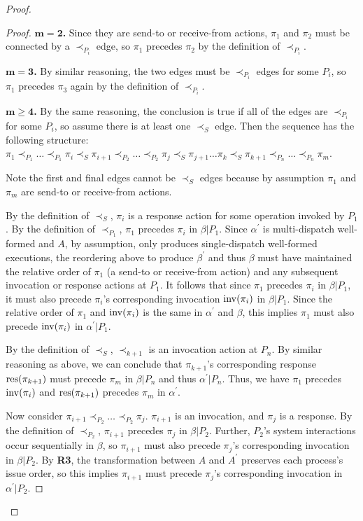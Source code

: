 \begin{proof}
\begin{proof}
      $\mathbf{m=2}$\textbf{.} Since they are send-to or receive-from actions, $\pi_1$ and $\pi_2$ must be connected by a $\prec_{P_i}$ edge, so $\pi_1$ precedes $\pi_2$ by the definition of $\prec_{P_i}$.

      $\mathbf{m=3}$\textbf{.} By similar reasoning, the two edges must be $\prec_{P_i}$ edges for some $P_i$, so $\pi_1$ precedes $\pi_3$ again by the definition of $\prec_{P_i}$.

      $\mathbf{m \geq 4}$\textbf{.} By the same reasoning, the conclusion is true if all of the edges are $\prec_{P_i}$ for some $P_i$, so assume there is at least one $\prec_S$ edge.
      Then the sequence has the following structure:
      $\pi_1 \prec_{P_1} \ldots \prec_{P_1} \pi_i \prec_S \pi_{i+1} \prec_{P_2} \ldots \prec_{P_2} \pi_j \prec_S \pi_{j+1} \ldots \pi_k \prec_S \pi_{k+1} \prec_{P_n} \ldots \prec_{P_n} \pi_m$.

      Note the first and final edges cannot be $\prec_S$ edges because by assumption $\pi_1$ and $\pi_m$ are send-to or receive-from actions.

      By the definition of $\prec_S$, $\pi_i$ is a response action for some operation invoked by $P_1$. By the definition of $\prec_{P_1}$, $\pi_1$ precedes $\pi_i$ in $\beta | P_1$. Since $\alpha^\prime$ is multi-dispatch well-formed and $A$, by assumption, only produces single-dispatch well-formed executions, the reordering above to produce $\beta^\prime$ and thus $\beta$ must have maintained the relative order of $\pi_1$ (a send-to or receive-from action) and any subsequent invocation or response actions at $P_1$. It follows that since $\pi_1$ precedes $\pi_i$ in $\beta | P_1$, it must also precede $\pi_i$’s corresponding invocation $\operatorname{inv}(\pi_i)$ in $\beta | P_1$. Since the relative order of $\pi_1$ and $\operatorname{inv}(\pi_i)$ is the same in $\alpha^\prime$ and $\beta$, this implies $\pi_1$ must also precede $\operatorname{inv}(\pi_i)$ in $\alpha^\prime | P_1$.

      By the definition of $\prec_S$, $\prec_{k+1}$ is an invocation action at $P_n$. By similar reasoning as above, we can conclude that $\pi_{k+1}$’s corresponding response $\operatorname{\operatorname{res}}(\pi_{k+1})$ must precede $\pi_m$ in $\beta | P_n$ and thus $\alpha^\prime | P_n$. Thus, we have $\pi_1$ precedes $\operatorname{inv}(\pi_i)$ and $\operatorname{\operatorname{res}}(\pi_{k+1})$ precedes $\pi_m$ in $\alpha^\prime$.

      Now consider $\pi_{i+1} \prec_{P_2} \ldots \prec_{P_2} \pi_j$. $\pi_{i+1}$ is an invocation, and $\pi_j$ is a response. By the definition of $\prec_{P_2}$, $\pi_{i+1}$ precedes $\pi_j$ in $\beta | P_2$. Further, $P_2$’s system interactions occur sequentially in $\beta$, so $\pi_{i+1}$ must also precede $\pi_j$’s corresponding invocation in $\beta | P_2$. By \textbf{R3}, the transformation between $A$ and $A^\prime$ preserves each process’s issue order, so this implies $\pi_{i+1}$ must precede $\pi_j$’s corresponding invocation in $\alpha^\prime | P_2$.


\end{proof}
\end{proof}
